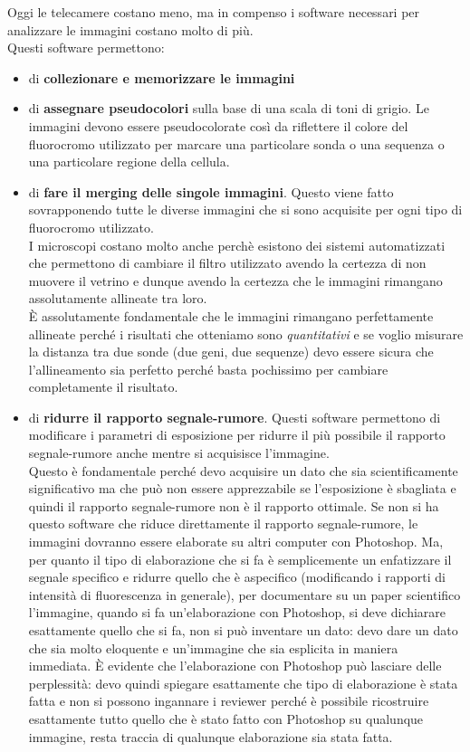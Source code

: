 \documentclass[11pt]{book}
\begin{document}
Oggi le telecamere costano meno, ma in compenso i software necessari per analizzare le immagini costano molto di più.\\
Questi software permettono:
\begin{itemize}
\item di \textbf{collezionare e memorizzare le immagini}
\item di \textbf{assegnare pseudocolori} sulla base di una scala di toni di grigio. Le immagini devono essere pseudocolorate così da riflettere il colore del fluorocromo utilizzato per marcare una particolare sonda o una sequenza o una particolare regione della cellula.
\item di \textbf{fare il merging delle singole immagini}. 
Questo viene fatto sovrapponendo tutte le diverse immagini che si sono acquisite per ogni tipo di fluorocromo utilizzato.\\
I microscopi costano molto anche perchè esistono dei sistemi automatizzati che permettono di cambiare il filtro utilizzato avendo la certezza di non muovere il vetrino e dunque avendo la certezza che le immagini rimangano assolutamente allineate tra loro.\\
È assolutamente fondamentale che le immagini rimangano perfettamente allineate perché i risultati che otteniamo sono \emph{quantitativi} e se voglio misurare la distanza tra due sonde (due geni, due sequenze) devo essere sicura che l’allineamento sia perfetto perché basta pochissimo per cambiare completamente il risultato.
\item di \textbf{ridurre il rapporto segnale-rumore}.
Questi software permettono di modificare i parametri di esposizione per ridurre il più possibile il rapporto segnale-rumore anche mentre si acquisisce l’immagine.\\
Questo è fondamentale perché devo acquisire un dato che sia scientificamente significativo ma che può non essere apprezzabile se l’esposizione è sbagliata e quindi il rapporto segnale-rumore non è il rapporto ottimale.
Se non si ha questo software che riduce direttamente il rapporto segnale-rumore, le immagini dovranno essere elaborate su altri computer con Photoshop. Ma, per quanto il tipo di elaborazione che si fa è semplicemente un enfatizzare il segnale specifico e ridurre quello che è aspecifico (modificando i rapporti di intensità di fluorescenza in generale), per documentare su un paper scientifico l’immagine, quando si fa un’elaborazione con Photoshop, si deve dichiarare esattamente quello che si fa, non si può inventare un dato: devo dare un dato che sia molto eloquente e un’immagine che sia esplicita in maniera immediata. È evidente che l’elaborazione con Photoshop può lasciare delle perplessità: devo quindi spiegare esattamente che tipo di elaborazione è stata fatta e non si possono ingannare i reviewer perché è possibile ricostruire esattamente tutto quello che è stato fatto con Photoshop su qualunque immagine, resta traccia di qualunque elaborazione sia stata fatta.  

\end{itemize}
\end{document}
